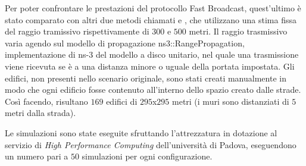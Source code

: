 Per poter confrontare le prestazioni del protocollo Fast Broadcast, quest'ultimo è stato comparato con altri due metodi chiamati \statica e \staticb,
che utilizzano una stima fissa del raggio tramissivo rispettivamente di $300$ e $500$ metri.
Il raggio trasmissivo varia agendo sul modello di propagazione \textsf{ns3::RangePropagation},
implementazione di ns-3 del modello a disco unitario, nel quale una trasmissione viene ricevuta se è a una distanza minore o uguale della portata impostata.
Gli edifici, non presenti nello scenario originale, sono stati creati manualmente in modo che ogni edificio fosse contenuto all'interno dello spazio creato dalle strade.
Così facendo, risultano $169$ edifici di $295$x$295$ metri (i muri sono distanziati di $5$ metri dalla strada).

Le simulazioni sono state eseguite sfruttando l'attrezzatura in dotazione al servizio di \textit{High Performance Computing} dell'università di Padova,
eseguendono un numero pari a $50$ simulazioni per ogni configurazione.
%
%
